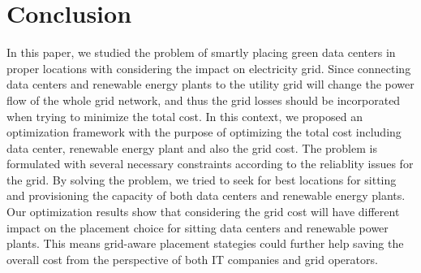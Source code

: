 \section{Conclusion}
\label{sec:conclusion}

In this paper, we studied the problem of smartly placing green data centers in proper locations with considering the impact on electricity grid. Since connecting data centers and renewable energy plants to the utility grid will change the power flow of the whole grid network, and thus the grid losses should be incorporated when trying to minimize the total cost. In this context, we proposed an optimization framework with the purpose of optimizing the total cost including data center, renewable energy plant and also the grid cost. The problem is formulated with several necessary constraints according to the reliablity issues for the grid. By solving the problem, we tried to seek for best locations for sitting and provisioning the capacity of both data centers and renewable energy plants. Our optimization results show that considering the grid cost will have different impact on the placement choice for sitting data centers and renewable power plants. This means grid-aware placement stategies could further help saving the overall cost from the perspective of both IT companies and grid operators.

